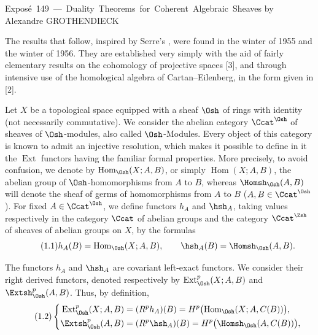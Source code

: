 \unit{Exposé 149 — Duality Theorems for Coherent Algebraic Sheaves}
%
  {by Alexandre GROTHENDIECK}

The results that follow, inspired by Serre's ,
were found in the winter of 1955 and the winter of 1956. They are established
very simply with the aid of fairly elementary results on the cohomology of
projective spaces [3], and through intensive use of the homological algebra of
Cartan--Eilenberg, in the form given in [2].


Let $X$ be a topological space equipped with a sheaf $\Osh$ of rings with
identity (not necessarily commutative). We consider the abelian category
$\Ccat^{\Osh}$ of sheaves of $\Osh$-modules, also called $\Osh$-Modules. Every
object of this category is known to admit an injective resolution, which makes
it possible to define in it the $\operatorname{Ext}$ functors having the familiar
formal properties. More precisely, to avoid confusion, we denote by
$\operatorname{Hom}_{\Osh}(X;A,B)$, or simply $\operatorname{Hom}(X;A,B)$, the
abelian group of $\Osh$-homomorphisms from $A$ to $B$, whereas
$\Homsh_{\Osh}(A,B)$ will denote the sheaf of germs of homomorphisms from $A$ to
$B$ ($A,B\in\Ccat^{\Osh}$). For fixed $A\in\Ccat^{\Osh}$, we define functors
$h_A$ and $\hsh_A$, taking values respectively in the category $\Ccat$ of
abelian groups and the category $\Ccat^{\Zsh}$ of sheaves of abelian groups on
$X$, by the formulas
\begin{equation}\tag{1.1}
  h_A(B)=\operatorname{Hom}_{\Osh}(X;A,B),
  \qquad
  \hsh_A(B)=\Homsh_{\Osh}(A,B).
\end{equation}

The functors $h_A$ and $\hsh_A$ are covariant left-exact functors. We consider
their right derived functors, denoted respectively by
$\operatorname{Ext}_{\Osh}^{p}(X;A,B)$ and $\Extsh_{\Osh}^{p}(A,B)$. Thus, by
definition,
\begin{equation}\tag{1.2}
\left\{
\begin{aligned}
\operatorname{Ext}_{\Osh}^{p}(X;A,B)
  &= (R^{p}h_A)(B)
   = H^{p}\bigl(\operatorname{Hom}_{\Osh}(X;A,C(B))\bigr),\\
\Extsh_{\Osh}^{p}(A,B)
  &= (R^{p}\hsh_A)(B)
   = H^{p}\bigl(\Homsh_{\Osh}(A,C(B))\bigr),
\end{aligned}
\right.
\end{equation}

